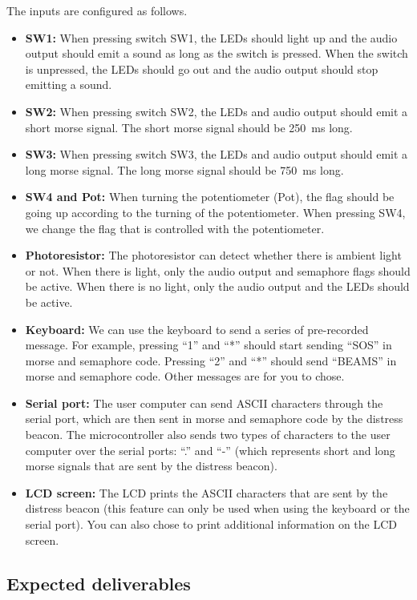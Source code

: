 The inputs are configured as follows. 
\begin{itemize}
	\item \textbf{SW1:} When pressing switch SW1, the LEDs should light up and the audio output should emit a sound as long as the switch is pressed. When the switch is unpressed, the LEDs should go out and the audio output should stop emitting a sound. 
	\item \textbf{SW2:} When pressing switch SW2, the LEDs and audio output should emit a short morse signal. The short morse signal should be 250~ms long. 
	\item \textbf{SW3: } When pressing switch SW3, the LEDs and audio output should emit a long morse signal. The long morse signal should be 750~ms long. 
	\item \textbf{SW4 and Pot: } When turning the potentiometer (Pot), the flag should be going up according to the turning of the potentiometer. When pressing SW4, we change the flag that is controlled with the potentiometer. 
	\item \textbf{Photoresistor: } The photoresistor can detect whether there is ambient light or not. When there is light, only the audio output and semaphore flags should be active. When there is no light, only the audio output and the LEDs should be active. 
	\item \textbf{Keyboard: } We can use the keyboard to send a series of pre-recorded message. For example, pressing ``1'' and ``*'' should start sending ``SOS'' in morse and semaphore code. Pressing ``2'' and ``*'' should send ``BEAMS'' in morse and semaphore code. Other messages are for you to chose. 
	\item \textbf{Serial port: } The user computer can send ASCII characters through the serial port, which are then sent in morse and semaphore code by the distress beacon. The microcontroller also sends two types of characters to the user computer over the serial ports: ``.'' and ``-'' (which represents short and long morse signals that are sent by the distress beacon). 
	\item \textbf{LCD screen: } The LCD prints the ASCII characters that are sent by the distress beacon (this feature can only be used when using the keyboard or the serial port). You can also chose to print additional information on the LCD screen. 
\end{itemize}



\subsection{Expected deliverables}

